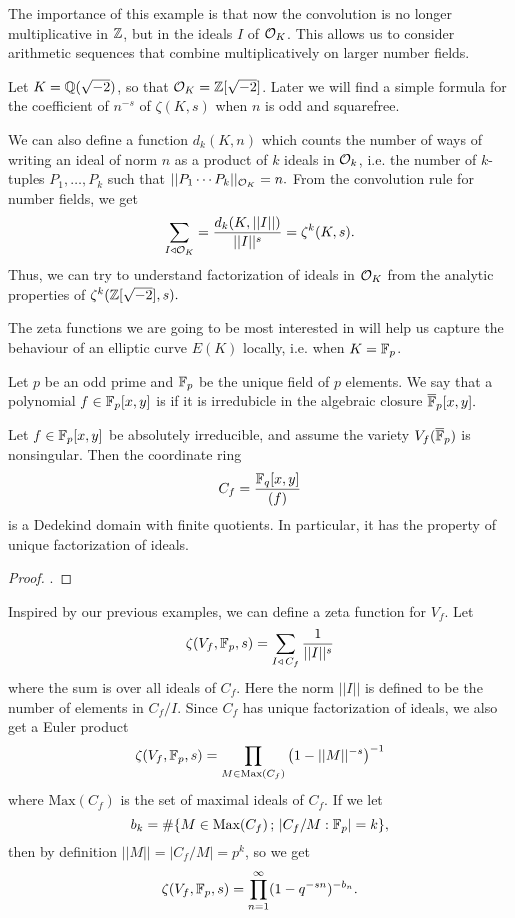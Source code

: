 \documentclass[12pt, a4paper]{amsart}
\begin{document}
The importance of this example is that now the convolution is no longer
multiplicative in ${\mathbb Z}$, but in the ideals $I$ of ${\mathcal O}_K$. This allows us to
consider arithmetic sequences that combine multiplicatively on larger
number fields.

\begin{example} \label{dedekind_example}
  Let $K = {\mathbb Q}(\sqrt{-2})$, so that ${\mathcal O}_K = {\mathbb Z}[\sqrt{-2}]$. 
  Later we will find a simple formula for the coefficient of $n^{-s}$ of
  $\zeta(K,s)$ when $n$ is odd and squarefree.

  We can also
  define a function $d_k(K,n)$ which counts the number of ways of writing an
  ideal of norm $n$ as a product of $k$ ideals in ${\mathcal O}_k$, i.e. the number of
  $k$-tuples $P_1, \dots, P_k$ such that $||P_1 \cdots P_k||_{{\mathcal O}_K} = n.$
  From the convolution rule for number fields, we get
  \[\sum\limits_{I \triangleleft {\mathcal O}_K} = \frac{d_k(K,||I||)}{||I||^s} =
  \zeta^k(K,s).\]
Thus, we can try to understand factorization of ideals in ${\mathcal O}_K$ from
the analytic properties of $\zeta^k({\mathbb Z}[\sqrt{-2}], s).$
\end{example}

The zeta functions we are going to be most interested in will help us capture
the behaviour of an elliptic curve $E(K)$ locally, i.e. when $K = \mathbb{F}_p$.

Let $p$ be an odd prime and $\mathbb{F}_p$ be the unique field of $p$ elements. We say
that a polynomial $f \in \mathbb{F}_p[x,y]$ is  if it is
irredubicle in the algebraic closure $\overline{\mathbb{F}}_p[x,y].$

\begin{prop}
  Let $f \in \mathbb{F}_p[x,y]$ be absolutely irreducible, and assume the variety
  $V_f(\overline{\mathbb{F}}_p)$ is nonsingular. Then the coordinate ring
  \[C_f = \frac{\mathbb{F}_q[x,y]}{(f)}\]
  is a Dedekind domain with finite quotients. In particular, it has the property
  of unique factorization of ideals.
\end{prop}
\begin{proof}
  \cite[See][Corollary 2.7, page 229]{lorenzini}.
\end{proof}

Inspired by our previous examples, we can define a zeta function for $V_f$. Let
\[\zeta(V_f, \mathbb{F}_p, s) = \sum\limits_{I \triangleleft \, C_f} \frac{1}{||I||^s}
\]
where the sum is over all ideals of $C_f$. Here the norm $||I||$ is defined to
be the number of elements in $C_f / I$. Since $C_f$ has unique factorization
of ideals, we also get a Euler product 
\[\zeta(V_f, \mathbb{F}_p, s) = \prod\limits_{M \in \text{Max}(C_f)} \left( 1 - ||M||^{-s} \right)^{-1}\]
where $\text{Max}(C_f)$ is the set of maximal ideals of $C_f$.
If we let
\[b_k = \# \{M \in \text{Max}(C_f) \, ; \, |C_f/M : \mathbb{F}_p| = k\},\]
then by definition $||M|| = |C_f/M| = p^k$, so we get
\[\zeta(V_f, \mathbb{F}_p, s) = \prod\limits_{n=1}^\infty (1 - q^{-sn})^{-b_n}.\]
\end{document}
